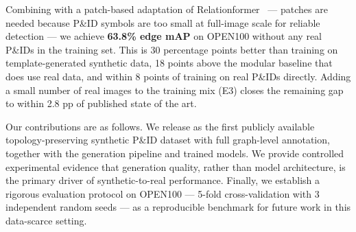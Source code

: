 Combining \ours{} with a patch-based adaptation of
Relationformer~\cite{shit2022} --- patches are needed because P\&ID
symbols are too small at full-image scale for reliable detection ---
we achieve \textbf{63.8\% edge mAP} on OPEN100 without any real P\&IDs
in the training set.
This is 30 percentage points better than training on template-generated
synthetic data, 18 points above the modular baseline that does use real
data, and within 8 points of training on real P\&IDs directly.
Adding a small number of real images to the training mix (E3) closes the
remaining gap to within 2.8 pp of published state of the art.

Our contributions are as follows.
We release \ours{} as the first publicly available topology-preserving
synthetic P\&ID dataset with full graph-level annotation, together with
the generation pipeline and trained models.
We provide controlled experimental evidence that generation quality,
rather than model architecture, is the primary driver of
synthetic-to-real performance.
Finally, we establish a rigorous evaluation protocol on OPEN100 ---
5-fold cross-validation with 3 independent random seeds --- as a
reproducible benchmark for future work in this data-scarce setting.
